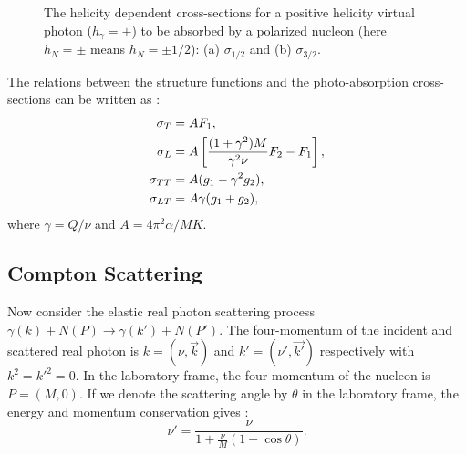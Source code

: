 \begin{figure}[tb!]
\begin{subfigure}[t]{0.4\textwidth}
    \subcaption{{}\label{C2S4F1B}}
  \end{subfigure}
  \caption[Schematic of the helicity dependent cross-sections $\sigma_{1/2}$ and $\sigma_{3/2}$.]{The helicity dependent cross-sections for a positive helicity virtual photon ($h_\gamma=+$) to be absorbed by a polarized nucleon (here $h_N=\pm$ means $h_N=\pm 1/2$): (a) $\sigma_{1/2}$ and (b) $\sigma_{3/2}$. \label{C2S4F1}}
\end{figure}

The relations between the structure functions and the photo-absorption cross-sections can be written as \cite{Thomas2001,Drechsel2003}:
\begin{align} \label{C2S4E6}
\sigma_T & = AF_1, \\ \label{C2S4E7}
\sigma_L & = A\left[\frac{(1+\gamma^2)M}{\gamma^2\nu}F_2-F_1\right], \\ \label{C2S4E8}
\sigma_{TT} & = A(g_1-\gamma^2g_2), \\ \label{C2S4E9}
\sigma_{LT} & = A\gamma(g_1+g_2),
\end{align}
where $\gamma=Q/\nu$ and $A=4\pi^2\alpha/MK$.

\subsection{Compton Scattering}
\label{C2S4SS2}

Now consider the elastic real photon scattering process $\gamma(k)+N(P)\rightarrow\gamma(k')+N(P')$. The four-momentum of the incident and scattered real photon is $k=(\nu,\vec{k})$ and $k'=(\nu',\vec{k'})$ respectively with $k^2=k'^2=0$. In the laboratory frame, the four-momentum of the nucleon is $P=(M,0)$. If we denote the scattering angle by $\theta$ in the laboratory frame, the energy and momentum conservation gives \cite{Thomas2001}:
\begin{equation} \label{C2S4E10}
\nu' = \frac{\nu}{1+\frac{\nu}{M}(1-\cos\theta)}.
\end{equation}

